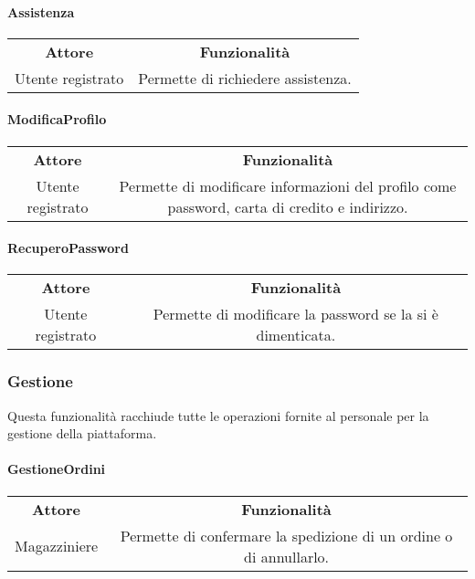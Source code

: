 \documentclass[12pt,a4paper]{article}
\begin{document}
\paragraph*{Assistenza}
\begin{center}
\begin{tabular}{|c|c|}
\rowcolor[gray]{0.8}
\hline
\textbf{Attore} & \textbf{Funzionalità} \\
Utente registrato & Permette di richiedere assistenza. \\
\hline
\end{tabular}
\end{center}

\paragraph*{ModificaProfilo}
\begin{center}
\begin{tabular}{|c|c|}
\rowcolor[gray]{0.8}
\hline
\textbf{Attore} & \textbf{Funzionalità} \\
Utente registrato & Permette di modificare informazioni del profilo come password, carta di credito e indirizzo. \\
\hline
\end{tabular}
\end{center}

\paragraph*{RecuperoPassword}
\begin{center}
\begin{tabular}{|c|c|}
\rowcolor[gray]{0.8}
\hline
\textbf{Attore} & \textbf{Funzionalità} \\
Utente registrato & Permette di modificare la password se la si è dimenticata. \\
\hline
\end{tabular}
\end{center}

\subsubsection{Gestione}
Questa funzionalità racchiude tutte le operazioni fornite al personale per la gestione della piattaforma.

\paragraph*{GestioneOrdini}
\begin{center}
\begin{tabular}{|c|c|}
\rowcolor[gray]{0.8}
\hline
\textbf{Attore} & \textbf{Funzionalità} \\
Magazziniere & Permette di confermare la spedizione di un ordine o di annullarlo. \\
\hline
\end{tabular}
\end{center}
\end{document}
